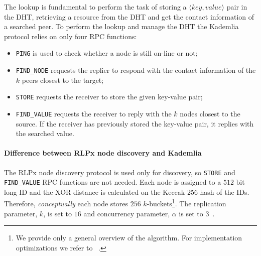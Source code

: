 The lookup is fundamental to perform the task of storing a $\langle key,
value\rangle$ pair in the DHT, retrieving a resource from the DHT and get
the contact information of a searched peer.
To perform the lookup and manage the DHT the Kademlia protocol relies on only
four RPC functions:
\begin{itemize}
    \item \verb|PING| is used to check whether a node is still on-line
    or not;
    \item \verb|FIND_NODE| requests the replier to respond with the contact
    information of the $k$ peers closest to the target;
    \item \verb|STORE| requests the receiver to store the given
    key-value pair;
    \item \verb|FIND_VALUE| requests the receiver to reply with the $k$
    nodes closest to the source. If the receiver has previously stored the
    key-value pair, it replies with the searched value.
\end{itemize}


\paragraph{Difference between RLPx node discovery and Kademlia}
\label{sec:rlpx-discovery}
The RLPx node discovery protocol is used only for discovery, so
\verb|STORE| and \verb|FIND_VALUE| RPC functions are not
needed.
Each node is assigned to a $512$ bit long ID and the XOR distance is calculated
on the Keccak-256-hash of the IDs. Therefore,
\emph{conceptually} each node stores $256$ $k$-buckets\footnote{
    We provide only a general overview of the algorithm. For implementation
    optimizations we refer to ~\cite{bib:kademlia}.}.
The replication parameter, $k$, is set to $16$ and concurrency parameter,
$\alpha$ is set to $3$~\cite{bib:rlpx-discovery-protocol}.

